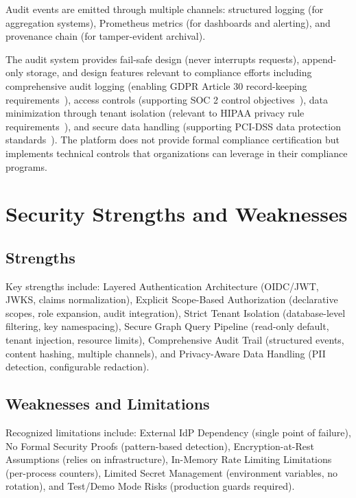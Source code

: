 \documentclass[a4paper,twoside]{sapthesis}
\begin{document}
Audit events are emitted through multiple channels: structured logging (for aggregation systems), Prometheus metrics (for dashboards and alerting), and provenance chain (for tamper-evident archival).

The audit system provides fail-safe design (never interrupts requests), append-only storage, and design features relevant to compliance efforts including comprehensive audit logging (enabling GDPR Article 30 record-keeping requirements~\cite{eu2016gdpr}), access controls (supporting SOC 2 control objectives~\cite{aicpa2017soc2}), data minimization through tenant isolation (relevant to HIPAA privacy rule requirements~\cite{hhs2013hipaa}), and secure data handling (supporting PCI-DSS data protection standards~\cite{pcissc2018pcidss}). The platform does not provide formal compliance certification but implements technical controls that organizations can leverage in their compliance programs.

\section{Security Strengths and Weaknesses}
\label{sec:security-strengths-weaknesses}

\subsection{Strengths}
\label{subsec:security-strengths}

Key strengths include: Layered Authentication Architecture (OIDC/JWT, JWKS, claims normalization), Explicit Scope-Based Authorization (declarative scopes, role expansion, audit integration), Strict Tenant Isolation (database-level filtering, key namespacing), Secure Graph Query Pipeline (read-only default, tenant injection, resource limits), Comprehensive Audit Trail (structured events, content hashing, multiple channels), and Privacy-Aware Data Handling (PII detection, configurable redaction).

\subsection{Weaknesses and Limitations}
\label{subsec:security-weaknesses}

Recognized limitations include: External IdP Dependency (single point of failure), No Formal Security Proofs (pattern-based detection), Encryption-at-Rest Assumptions (relies on infrastructure), In-Memory Rate Limiting Limitations (per-process counters), Limited Secret Management (environment variables, no rotation), and Test/Demo Mode Risks (production guards required).
\end{document}

